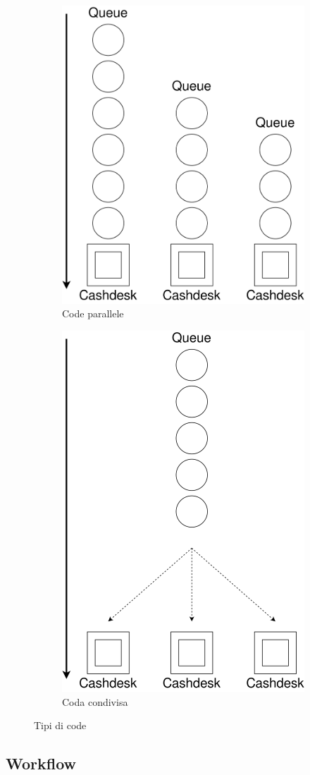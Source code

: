 \begin{figure}[H]
\centering
\begin{subfigure}{.5\textwidth}
  \centering
  \includegraphics[width=.5\linewidth]{"images/parallel-queues.png"}
  \caption{Code parallele}
  \label{fig:sub1}
\end{subfigure}%
\begin{subfigure}{.5\textwidth}
  \centering
  \includegraphics[width=.5\linewidth]{"images/n-fork.png"}
  \caption{Coda condivisa}
  \label{fig:sub2}
\end{subfigure}
\caption{Tipi di code}
\label{fig:test}
\end{figure}


\subsection{Workflow}

